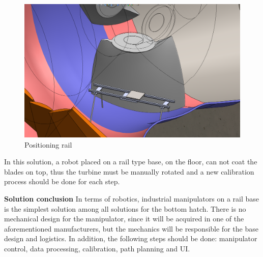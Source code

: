 \begin{figure}[h!]	
	\includegraphics[width=\columnwidth]{figs/manipuladores/rail2.PNG}
	\caption{Positioning rail}
	\label{fig::rail2}
\end{figure}

In this solution, a robot placed on a rail type base, on the floor, can not coat
the blades on top, thus the turbine must be manually rotated and a new
calibration process should be done for each step.


\textbf{Solution conclusion}
In terms of robotics, industrial manipulators on a rail base is the simplest
solution among all solutions for the bottom hatch. There is no
mechanical design for the manipulator, since it will be acquired in one of the
aforementioned manufacturers, but the mechanics will be responsible for the base
design and logistics. In addition, the following steps should be done:
manipulator control, data processing, calibration, path planning and UI.

